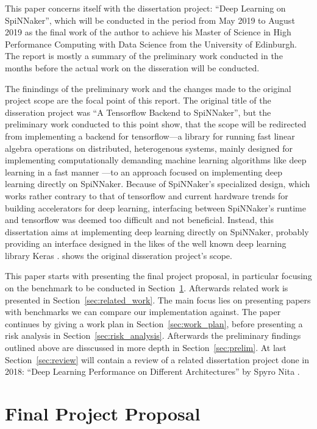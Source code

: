 \documentclass{article}
\begin{document}
This paper concerns itself with the dissertation project:
``Deep Learning on SpiNNaker'', which will be conducted in
the period from May 2019 to August 2019 as the final work
of the author to achieve his Master of Science in
High Performance Computing with Data Science from the
University of Edinburgh.
The report is mostly a summary of the preliminary work
conducted in the months before the actual work on the
disseration will be conducted.

The finindings of the preliminary work and the changes made
to the original project scope are the focal point of this
report.
The original title of the disseration project was ``A
Tensorflow Backend to SpiNNaker'', but the preliminary work
conducted to this point show, that the scope will be
redirected from implementing a backend for tensorflow---a
library for running fast linear algebra operations on
distributed, heterogenous systems, mainly designed for
implementing computationally demanding machine learning
algorithms like deep learning in a fast manner
\citep{tf2015}---to an approach focused on implementing
deep learning directly on SpiNNaker.
Because of SpiNNaker's specialized design, which works
rather contrary to that of tensorflow and current hardware
trends for building accelerators for deep learning,
interfacing between SpiNNaker's runtime and tensorflow was
deemed too difficult and not beneficial.
Instead, this dissertation aims at implementing deep
learning directly on SpiNNaker, probably providing an
interface designed in the likes of the well known deep
learning library Keras \citep{keras}.
\citet{proj} shows the original disseration project's
scope.

This paper starts with presenting the final project
proposal, in particular focusing on the benchmark to be
conducted in Section~\ref{sec:proposal}.
Afterwards related work is presented in
Section~\ref{sec:related_work}.
The main focus lies on presenting papers with benchmarks
we can compare our implementation against.
The paper continues by giving a work plan in
Section~\ref{sec:work_plan}, before presenting a risk
analysis in Section~\ref{sec:risk_analysis}.
Afterwards the preliminary findings outlined above are
disscussed in more depth in Section~\ref{sec:prelim}.
At last Section~\ref{sec:review} will contain a review of a
related dissertation project done in 2018:
``Deep Learning Performance on Different Architectures'' by
Spyro Nita \citep{nita_2018}.


\section{Final Project Proposal} %
\label{sec:proposal}
\end{document}

